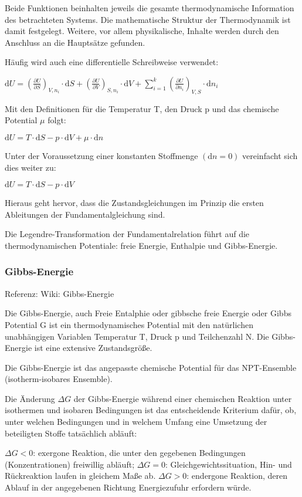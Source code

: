 \documentclass[]{article}
\begin{document}
Beide Funktionen beinhalten jeweils die gesamte thermodynamische Information des betrachteten Systems. Die mathematische Struktur der Thermodynamik ist damit festgelegt. Weitere, vor allem physikalische, Inhalte werden durch den Anschluss an die Hauptsätze gefunden.

Häufig wird auch eine differentielle Schreibweise verwendet:

$ \mathrm{d} U = \left( \frac {\partial U}{\partial S} \right)_{V, n_i} \cdot \mathrm{d}S + \left( \frac {\partial U}{\partial V} \right)_{S, n_i} \cdot \mathrm{d}V + \sum_{i = 1}^k \left( \frac {\partial U}{\partial n_i} \right)_{V, S} \cdot \mathrm{d}n_i$

Mit den Definitionen für die Temperatur T, den Druck p und das chemische Potential $\mu$ folgt:

$\mathrm{d}U = T \cdot \mathrm{d}S - p \cdot \mathrm{d}V + \mu \cdot \mathrm{d}n$

Unter der Voraussetzung einer konstanten Stoffmenge $(\mathrm{d}n = 0)$ vereinfacht sich dies weiter zu:

$ \mathrm{d}U = T \cdot \mathrm{d}S - p \cdot \mathrm{d}V$

Hieraus geht hervor, dass die Zustandsgleichungen im Prinzip die ersten Ableitungen der Fundamentalgleichung sind.

Die Legendre-Transformation der Fundamentalrelation führt auf die thermodynamischen Potentiale: freie Energie, Enthalpie und Gibbs-Energie.
		
\subsubsection{Gibbs-Energie}
Referenz: Wiki: Gibbs-Energie

Die Gibbs-Energie, auch Freie Entalphie oder gibbsche freie Energie oder Gibbs Potential G ist ein thermodynamisches Potential mit den natürlichen unabhängigen Variablen Temperatur T, Druck p und Teilchenzahl N.  Die Gibbs-Energie ist eine extensive Zustandsgröße.

Die Gibbs-Energie ist das angepasste chemische Potential für das NPT-Ensemble (isotherm-isobares Ensemble).

Die Änderung $\Delta G$ der Gibbs-Energie während einer chemischen Reaktion unter isothermen und isobaren Bedingungen ist das entscheidende Kriterium dafür, ob, unter welchen Bedingungen und in welchem Umfang eine Umsetzung der beteiligten Stoffe tatsächlich abläuft:

$\Delta G<0$: exergone Reaktion, die unter den gegebenen Bedingungen (Konzentrationen) freiwillig abläuft;
$\Delta G=0$: Gleichgewichtssituation, Hin- und Rückreaktion laufen in gleichem Maße ab.
$\Delta G>0$: endergone Reaktion, deren Ablauf in der angegebenen Richtung Energiezufuhr erfordern würde.	
\end{document}
